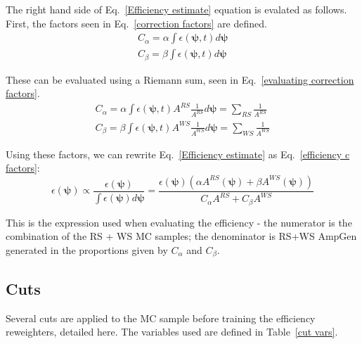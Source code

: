 \documentclass[note.tex]{subfiles}
\begin{document}
The right hand side of Eq.~\ref{Efficiency estimate} equation is evalated as follows.
First, the factors seen in Eq.~\ref{correction factors} are defined.
\begin{equation}
    \begin{aligned}
        C_\alpha = \alpha \int \epsilon(\mathbf{\psi}, t) d\mathbf{\psi} \\
        C_\beta = \beta \int \epsilon(\mathbf{\psi}, t) d\mathbf{\psi}
    \end{aligned}
    \label{correction factors}
\end{equation}

These can be evaluated using a Riemann sum, seen in Eq.~\ref{evaluating correction factors}.
\begin{equation}
    \begin{aligned}
        C_\alpha = \alpha \int \epsilon(\mathbf{\psi}, t) A^{RS}\frac{1}{A^{RS}}d\mathbf{\psi} = \sum_{RS}\frac{1}{A^{RS}} \\
        C_\beta = \beta \int \epsilon(\mathbf{\psi}, t)A^{WS} \frac{1}{A^{WS}} d\mathbf{\psi} = \sum_{WS}\frac{1}{A^{WS}}
    \end{aligned}
    \label{evaluating correction factors}
\end{equation}

Using these factors, we can rewrite Eq.~\ref{Efficiency estimate} as Eq.~\ref{efficiency c factors}:
\begin{equation}
    \epsilon(\mathbf{\psi}) \propto \frac{\epsilon(\mathbf{\psi})}{\int \epsilon(\mathbf{\psi}) d\mathbf{\psi}} = \frac{\epsilon(\mathbf{\psi})(\alpha A^{RS}(\mathbf{\psi}) + \beta A^{WS}(\mathbf{\psi}))}{C_\alpha A^{RS} + C_\beta A^{WS}}
    \label{efficiency c factors}
\end{equation}

This is the expression used when evaluating the efficiency - the numerator is the combination of the  RS + WS MC samples; the denominator is RS+WS AmpGen generated in the proportions given by $C_\alpha$ and $C_\beta$.

\subsection{Cuts}
Several cuts are applied to the MC sample before training the efficiency reweighters, detailed here.
The variables used are defined in Table~\ref{cut vars}.
\end{document}
